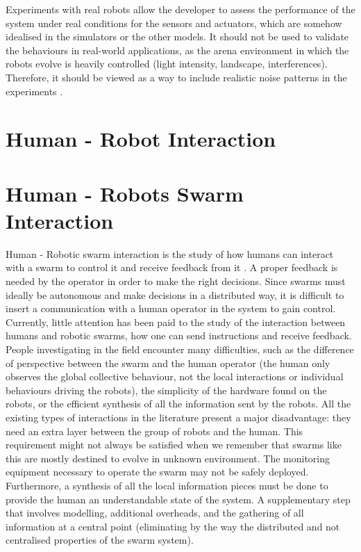 \documentclass[a4paper, 12pt]{report}
\begin{document}
		Experiments with real robots allow the developer to assess the performance of the system under real conditions for the sensors and actuators, which are somehow idealised in the simulators or the other models. It should not be used to validate the behaviours in real-world applications, as the arena environment in which the robots evolve is heavily controlled (light intensity, landscape, interferences). Therefore, it should be viewed as a way to include realistic noise patterns in the experiments \citep{brambilla2013swarm}.
	
	\section{Human - Robot Interaction}
	
	
	
	\section{Human - Robots Swarm Interaction}
	
	Human - Robotic swarm interaction is the study of how humans can interact with a swarm to control it and receive feedback from it \citep{brambilla2013swarm}. A proper feedback is needed by the operator in order to make the right decisions. Since swarms must ideally be autonomous and make decisions in a distributed way, it is difficult to insert a communication with a human operator in the system to gain control.\\
	
	Currently, little attention has been paid to the study of the interaction between humans and robotic swarms, how one can send instructions and receive feedback. People investigating in the field encounter many difficulties, such as the difference of perspective between the swarm and the human operator (the human only observes the global collective behaviour, not the local interactions or individual behaviours driving the robots), the simplicity of the hardware found on the robots, or the efficient synthesis of all the information sent by the robots. All the existing types of interactions in the literature present a major disadvantage: they need an extra layer between the group of robots and the human. This requirement might not always be satisfied when we remember that swarms like this are mostly destined to evolve in unknown environment. The monitoring equipment necessary to operate the swarm may not be safely deployed. Furthermore, a synthesis of all the local information pieces must be done to provide the human an understandable state of the system. A supplementary step that involves modelling, additional overheads, and the gathering of all information at a central point (eliminating by the way the distributed and not centralised properties of the swarm system).
	
\end{document}
